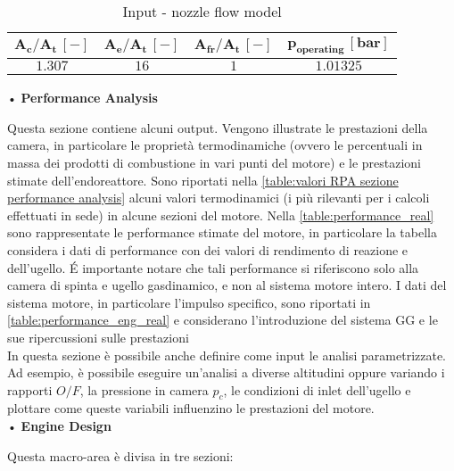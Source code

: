 \begin{itemize}
\begin{table}[H]
\centering
\begin{tabular}{|c|c|c|c|}
\hline
$\bm{A_c / A_t \, [-]}$ & $\bm{A_e / A_t \, [-]}$ & $\bm{A_{fr}/A_{t} \, [-]}$ & $\bm{p_{operating} \, [bar]}$  \\
\hline
$1.307$ & $16$ & $1$ & $1.01325$ \\
\hline
\end{tabular}
\caption{Input - nozzle flow model}
\label{table:nozzle_model}
\end{table}
\end{itemize}

• \textbf{Performance Analysis}

Questa sezione contiene alcuni output. Vengono illustrate le prestazioni della camera, in particolare le proprietà termodinamiche (ovvero le percentuali in massa dei prodotti di combustione in vari punti del motore) e le prestazioni stimate dell'endoreattore. Sono riportati nella \autoref{table:valori RPA sezione performance analysis} alcuni valori termodinamici (i più rilevanti per i calcoli effettuati in sede) in alcune sezioni del motore. Nella \autoref{table:performance_real} sono rappresentate le performance stimate del motore, in particolare la tabella considera i dati di performance con dei valori di rendimento di reazione e dell'ugello. \'E importante notare che tali performance si riferiscono solo alla camera di spinta e ugello gasdinamico, e non al sistema motore intero. I dati del sistema motore, in particolare l'impulso specifico, sono riportati in \autoref{table:performance_eng_real} e considerano l'introduzione del sistema GG e le sue ripercussioni sulle prestazioni \\
In questa sezione è possibile anche  definire come input le analisi parametrizzate. Ad esempio, è possibile eseguire un'analisi a diverse altitudini oppure variando i rapporti $O/F$, la pressione in camera $p_c$, le condizioni di inlet dell'ugello e plottare come queste variabili influenzino le prestazioni del motore.
\\
• \textbf{Engine Design}

Questa macro-area è divisa in tre sezioni: 

